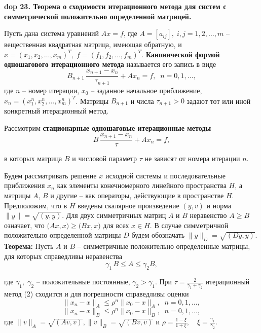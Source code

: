 \textbf{\LARGE dop 23. Теоpема о сходимости итеpационного метода для систем с симметpической положительно   опpеделенной матpицей.}

Пусть дана система уравнений $A x = f$,
где $A = [a_{ij}], \; i, j = 1,2,\ldots, m$ -- вещественная квадратная матрица, имеющая обратную, и $x = (x_1, x_2, \ldots, x_m)^T, \; f = (f_1, f_2, \ldots, f_m)^T$. \textbf{Канонической формой одношагового итерационного метода} называется его запись в виде 
$$
B_{n+1}\, \frac{x_{n+1} - x_{n}}{\tau_{n+1}} + A x_n = f, \;\; n = 0, 1, \ldots,
$$
где $n$ -- номер итерации, $x_0$ -- заданное начальное приближение, $x_n = (x_1^n, x_2^n, \ldots, x_m^n)^T$. Матрицы $B_{n+1}$ и числа $\tau_{n+1} > 0$ задают тот или иной конкретный итерационный метод.

Рассмотрим \textbf{стационарные одношаговые итерационные методы}
\begin{equation}
    B\, \frac{x_{n+1} - x_{n}}{\tau} + A x_n = f, 
    \tag{2}
\end{equation}

в которых матрица $B$ и числовой параметр $\tau$ не зависят от номера итерации $n$.

Будем рассматривать решение $x$ исходной системы  и последовательные приближения $x_n$ как элементы конечномерного линейного пространства $H$, а матрицы $A$, $B$ и другие -- как операторы, действующие в пространстве $H$. 
Предположим, что в $H$ введены скалярное произведение $(y, v)$ и норма $\|y\| = \sqrt{(y, y)}$. 
Для двух симметричных матриц $A$ и $B$ неравенство $A \geq B$ означает, что $\big(A x, x\big) \geq \big(B x, x\big)$ для всех $x \in H$. 
В случае симметричной положительно определенной матрицы $D$ будем обозначать $\|y\|_D = \sqrt{(D y , y)}$.\\

\textbf{Теорема:\;} Пусть $A$ и $B$ -- симметричные положительно определенные матрицы, для которых справедливы неравенства
\begin{equation}\tag{3}
    \gamma_1 \,B \leq A \leq \gamma_2 B,
\end{equation}

где $\gamma_1, \;\gamma_2$ -- положительные постоянные, $\gamma_2 > \gamma_1$. При 
$
\tau = \frac{2}{\gamma_1 + \gamma_2}
$ 
итерационный метод (2) сходится и для погрешности справедливы оценки 
$$
\|x_n - x\|_A \leq \rho^n \|x_0 - x\|_A, \;\; n = 0, 1, \ldots,
$$
$$
\|x_n - x\|_B \leq \rho^n \|x_0 - x\|_B, \;\; n = 0, 1, \ldots,
$$
где $\|v\|_A = \sqrt{(A v, v)}, \|v\|_B = \sqrt{(B v, v)}$\; и 
$
\rho = \frac{1 - \xi}{1 + \xi}, \quad \xi = \frac{\gamma_1}{\gamma_2}.
$

